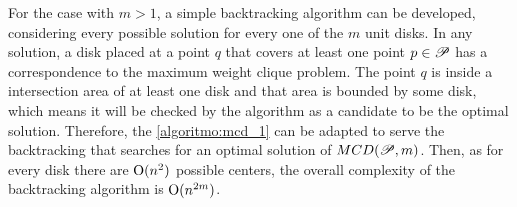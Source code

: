 For the case with $m>1$, a simple backtracking algorithm can be developed, considering every possible solution for every one of the $m$ unit disks. In any solution, a disk placed at a point $q$ that covers at least one point $p \in \mathscr{P}$ has a correspondence to the maximum weight clique problem. The point $q$ is inside a intersection area of at least one disk and that area is bounded by some disk, which means it will be checked by the algorithm as a candidate to be the optimal solution. Therefore, the \autoref{algoritmo:mcd_1} can be adapted to serve the backtracking that searches for an optimal solution of $MCD(\mathscr{P}, m)$. Then, as for every disk there are $\mathrm{O}(n^2)$ possible centers, the overall complexity of the backtracking algorithm is $\mathrm{O}(n^{2m})$.